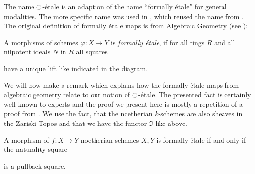 \documentclass[9pt,twosided]{amsart}
\begin{document}
The name ${\ocircle}$-étale is an adaption of the name ``formally étale'' for general modalities.
The more specific name was used in \cite{wellen-thesis}, which reused the name from \cite{SyntheticPDEs}.
The original definition of formally étale maps is from Algebraic Geometry (see \cite[§ 17]{GrothendieckDieudonne}):
\begin{defn}
  A morphisms of schemes $\varphi:X\to Y$ is \emph{formally étale},
  if for all rings $R$ and all nilpotent ideals $N$ in $R$ all squares
  \begin{center}
  \end{center}
  have a unique lift like indicated in the diagram.
\end{defn}
We will now make a remark which explains how the formally étale maps from algebraic geometry relate to our notion of ${\ocircle}$-étale.
The presented fact is certainly well known to experts and the proof we present here is mostly a repetition of a proof from \cite[Section 4.4]{wellen-thesis}.
We use the fact, that the noetherian $k$-schemes are also sheaves in the Zariski Topos and that we have the functor $\Im$ like above.
\begin{rmk}
  A morphism of $f:X\to Y$ noetherian schemes $X,Y$ is formally étale if and only if the naturality square
  \begin{center}
  \end{center}
  is a pullback square.
\end{rmk}
\end{document}
